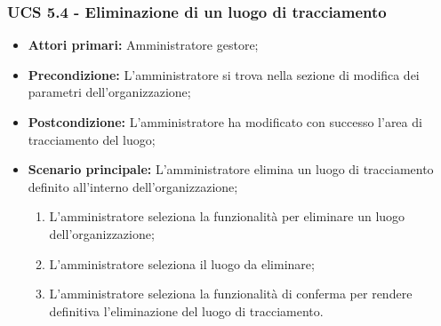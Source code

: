 \subsubsection{UCS 5.4 - Eliminazione di un luogo di tracciamento}%
\begin{itemize}
    \item \textbf{Attori primari:} Amministratore gestore;
    \item \textbf{Precondizione:} L'amministratore si trova nella sezione di modifica dei parametri dell'organizzazione;
    \item \textbf{Postcondizione:} L'amministratore ha modificato con successo l'area di tracciamento del luogo;
    \item \textbf{Scenario principale:} L'amministratore elimina un luogo di tracciamento definito all'interno dell'organizzazione;
    \begin{enumerate}%
        \item L'amministratore seleziona la funzionalità per eliminare un luogo dell'organizzazione;
        \item L'amministratore seleziona il luogo da eliminare;
        \item L'amministratore seleziona la funzionalità di conferma per rendere definitiva l'eliminazione del luogo di tracciamento.
    \end{enumerate}
\end{itemize}

